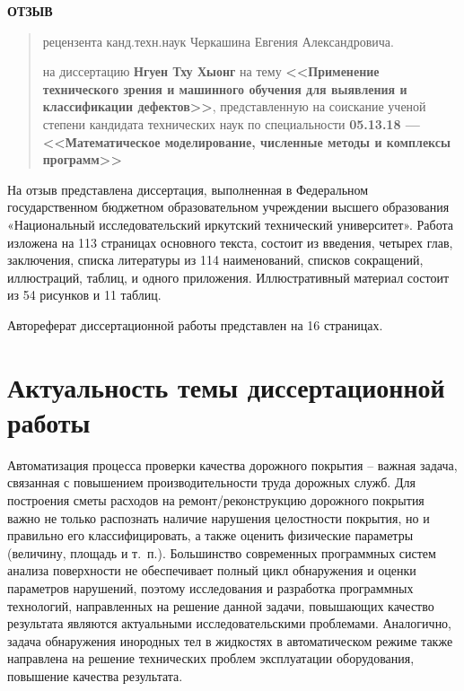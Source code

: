 \documentclass[12pt]{extarticle}
\begin{document}
\thispagestyle{empty}

\vspace{1em}
\begin{center}
  \large\textbf{ОТЗЫВ}
\end{center}
\begin{quote}
  \noindent рецензента канд.техн.наук Черкашина Евгения Александровича.

  \noindent на диссертацию \textbf{Нгуен Тху Хыонг} на тему \textbf{<<Применение технического зрения и машинного обучения для выявления и классификации дефектов>>}, представленную на соискание ученой степени кандидата технических наук по специальности \textbf{05.13.18 — <<Математическое моделирование, численные методы и комплексы программ>>}
\end{quote}

На отзыв представлена диссертация, выполненная в Федеральном государственном бюджетном образовательном учреждении высшего образования «Национальный исследовательский иркутский технический университет».  Работа изложена на 113 страницах основного текста, состоит из введения, четырех глав, заключения, списка литературы из 114 наименований, списков сокращений, иллюстраций, таблиц, и одного приложения.  Иллюстративный материал состоит из 54 рисунков и 11 таблиц.

Автореферат диссертационной работы представлен на 16 страницах.

\section{Актуальность темы диссертационной работы}

Автоматизация процесса проверки качества дорожного покрытия -- важная задача, связанная с повышением производительности труда дорожных служб.  Для построения сметы расходов на ремонт/реконструкцию дорожного покрытия важно не только распознать наличие нарушения целостности покрытия, но и правильно его классифицировать, а также оценить физические параметры (величину, площадь и т.~п.).  Большинство современных программных систем анализа поверхности не обеспечивает полный цикл обнаружения и оценки параметров нарушений, поэтому исследования и разработка программных технологий, направленных на решение данной задачи, повышающих качество результата являются актуальными исследовательскими проблемами.  Аналогично, задача обнаружения инородных тел в жидкостях в автоматическом режиме также направлена на решение технических проблем эксплуатации оборудования, повышение качества результата.
\end{document}
